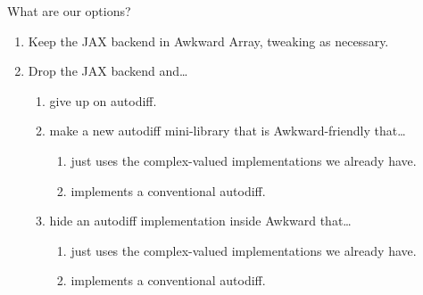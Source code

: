 \documentclass[aspectratio=169]{beamer}
\begin{document}
\begin{frame}{What are our options?}
\large
\vspace{0.5 cm}
\begin{enumerate}\setlength{\itemsep}{0.5 cm}
\item Keep the JAX backend in Awkward Array, tweaking as necessary.
\item Drop the JAX backend and\ldots\vspace{0.25 cm}
\begin{enumerate}\setlength{\itemsep}{0.25 cm}\large
\item give up on autodiff.
\item make a new autodiff mini-library that is Awkward-friendly that\ldots\vspace{0.125 cm}
\begin{enumerate}\setlength{\itemsep}{0.125 cm}\large
\item just uses the complex-valued implementations we already have.
\item implements a conventional autodiff.
\end{enumerate}
\item hide an autodiff implementation inside Awkward that\ldots\vspace{0.125 cm}
\begin{enumerate}\setlength{\itemsep}{0.125 cm}\large
\item just uses the complex-valued implementations we already have.
\item implements a conventional autodiff.
\end{enumerate}
\end{enumerate}
\end{enumerate}
\end{frame}
\end{document}
